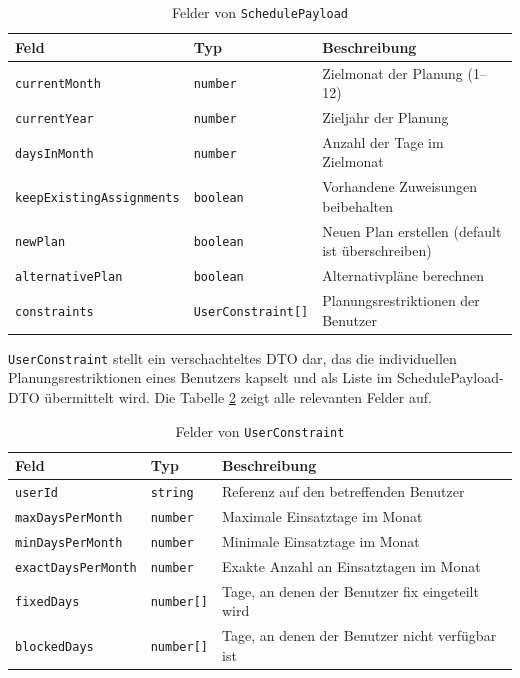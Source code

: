 \begin{table}[H]
	\centering
	\caption{Felder von \texttt{SchedulePayload}}\label{tab:schedule-payload}
	\begin{tabularx}{\linewidth}{l l >{\raggedright\arraybackslash}X}
		\toprule
		\textbf{Feld} & \textbf{Typ} & \textbf{Beschreibung} \\
		\midrule
		\texttt{currentMonth}              & \texttt{number}            & Zielmonat der Planung (1--12) \\
		\texttt{currentYear}               & \texttt{number}            & Zieljahr der Planung \\
		\texttt{daysInMonth}               & \texttt{number}            & Anzahl der Tage im Zielmonat \\
		\texttt{keepExistingAssignments}   & \texttt{boolean}           & Vorhandene Zuweisungen beibehalten \\
		\texttt{newPlan}                   & \texttt{boolean}           & Neuen Plan erstellen (default ist überschreiben) \\
		\texttt{alternativePlan}           & \texttt{boolean}           & Alternativpläne berechnen \\
		\texttt{constraints}               & \texttt{UserConstraint[]}  & Planungsrestriktionen der Benutzer \\
		\bottomrule
	\end{tabularx}
\end{table}
\texttt{UserConstraint} stellt ein verschachteltes DTO dar, das die individuellen Planungsrestriktionen eines Benutzers kapselt und als Liste im SchedulePayload-DTO übermittelt wird. Die Tabelle \ref{tab:user-constraint} zeigt alle relevanten Felder auf.

\begin{table}[H]
	\centering
	\caption{Felder von \texttt{UserConstraint}}\label{tab:user-constraint}
	\begin{tabularx}{\linewidth}{l l >{\raggedright\arraybackslash}X}
		\toprule
		\textbf{Feld} & \textbf{Typ} & \textbf{Beschreibung} \\
		\midrule
		\texttt{userId}              & \texttt{string}          & Referenz auf den betreffenden Benutzer \\
		\texttt{maxDaysPerMonth}     & \texttt{number}         & Maximale Einsatztage im Monat \\
		\texttt{minDaysPerMonth}     & \texttt{number}         & Minimale Einsatztage im Monat \\
		\texttt{exactDaysPerMonth}   & \texttt{number}         & Exakte Anzahl an Einsatztagen im Monat \\
		\texttt{fixedDays}           & \texttt{number[]}       & Tage, an denen der Benutzer fix eingeteilt wird \\
		\texttt{blockedDays}         & \texttt{number[]}       & Tage, an denen der Benutzer nicht verfügbar ist \\
		\bottomrule
	\end{tabularx}
\end{table}

